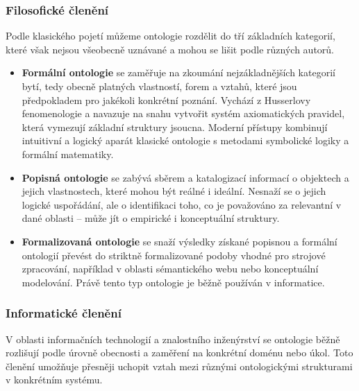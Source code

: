 \subsubsection{Filosofické členění}
\label{sec:filozofické-členění}
Podle klasického pojetí můžeme ontologie rozdělit do tří základních kategorií, které však nejsou všeobecně uznávané a mohou se lišit podle různých autorů. \cite{Corazzon2021,Casellas2011}
\begin{itemize}
  \item \textbf{Formální ontologie} se zaměřuje na zkoumání nejzákladnějších kategorií bytí, tedy obecně platných vlastností, forem a vztahů, které jsou předpokladem pro jakékoli konkrétní poznání. Vychází z Husserlovy fenomenologie a navazuje na snahu vytvořit systém axiomatických pravidel, která vymezují základní struktury jsoucna. Moderní přístupy kombinují intuitivní a logický aparát klasické ontologie s metodami symbolické logiky a formální matematiky.
  \item \textbf{Popisná ontologie} se zabývá sběrem a katalogizací informací o objektech a jejich vlastnostech, které mohou být reálné i ideální. Nesnaží se o jejich logické uspořádání, ale o identifikaci toho, co je považováno za relevantní v dané oblasti – může jít o empirické i konceptuální struktury.
  \item \textbf{Formalizovaná ontologie} se snaží výsledky získané popisnou a formální ontologií převést do striktně formalizované podoby vhodné pro strojové zpracování, například v oblasti sémantického webu nebo konceptuální modelování. Právě tento typ ontologie je běžně používán v informatice.\cite{Poli2003}
\end{itemize}


\subsubsection{Informatické členění}
\label{sec:informatické-členění}
V oblasti informačních technologií a znalostního inženýrství se ontologie běžně rozlišují podle úrovně obecnosti a zaměření na konkrétní doménu nebo úkol. Toto členění umožňuje přesněji uchopit vztah mezi různými ontologickými strukturami v konkrétním systému.

